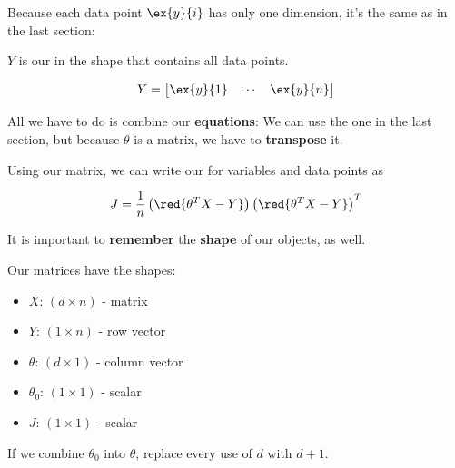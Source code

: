         Because each data point $\ex{y}{i}$ has only one dimension, it's the same as in the last section:\\
        
        \begin{kequation}
            $Y$ is our  in the shape  that contains all data points.
            
            \begin{equation*}
                Y = 
                    \begin{bmatrix}
                        \ex{y}{1} & \cdots & \ex{y}{n}
                    \end{bmatrix}
            \end{equation*}
        \end{kequation}
        
        All we have to do is combine our \textbf{equations}: We can use the one in the last section, but because $\theta$ is a matrix, we have to \textbf{transpose} it.\\
        
        \begin{kequation}
            Using our  matrix, we can write our  for  variables and  data points as
            
            \begin{equation*}
                J = \frac{1}{n}
                    \left( \red{ \theta^T X - Y} \right)
                    \left( \red{ \theta^T X - Y} \right)^T
            \end{equation*}
        \end{kequation}
        
        It is important to \textbf{remember} the \textbf{shape} of our objects, as well.\\
        
        \begin{concept}
            Our matrices have the shapes:
            
            \begin{itemize}
                \item $X$:        $(d \times n)$ - matrix
                \item $Y$:        $(1 \times n)$ - row vector\\
                
                \item $\theta$:   $(d \times 1)$ - column vector
                \item $\theta_0$: $(1 \times 1)$ - scalar\\
                
                \item $J$:        $(1 \times 1)$ - scalar
            \end{itemize}
            
            If we combine $\theta_0$ into $\theta$, replace every use of $d$ with $d+1$.
            
        \end{concept}
        
